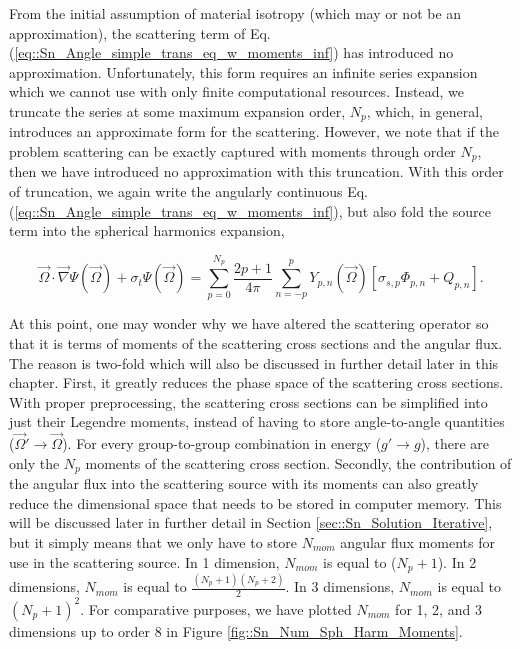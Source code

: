 From the initial assumption of material isotropy (which may or not be an approximation), the scattering term of Eq. (\ref{eq::Sn_Angle_simple_trans_eq_w_moments_inf}) has introduced no approximation. Unfortunately, this form requires an infinite series expansion which we cannot use with only finite computational resources. Instead, we truncate the series at some maximum expansion order, $N_p$, which, in general, introduces an approximate form for the scattering. However, we note that if the problem scattering can be exactly captured with moments through order $N_p$, then we have introduced no approximation with this truncation. With this order of truncation, we again write the angularly continuous Eq. (\ref{eq::Sn_Angle_simple_trans_eq_w_moments_inf}), but also fold the source term into the spherical harmonics expansion,

\begin{equation}
\label{eq::Sn_Angle_simple_trans_eq_w_moments_trunc}
\vec{\Omega} \cdot \vec{\nabla} \Psi (\vec{\Omega}) + \sigma_t \Psi (\vec{\Omega}) = \sum_{p=0}^{N_p} \frac{2p + 1}{4 \pi}   \sum_{n=-p}^{p}   Y_{p,n} (  \vec{\Omega} ) \left[ \sigma_{s,p} \Phi_{p,n} + Q_{p,n}  \right] .
\end{equation}

At this point, one may wonder why we have altered the scattering operator so that it is terms of moments of the scattering cross sections and the angular flux. The reason is two-fold which will also be discussed in further detail later in this chapter. First, it greatly reduces the phase space of the scattering cross sections. With proper preprocessing, the scattering cross sections can be simplified into just their Legendre moments, instead of having to store angle-to-angle quantities ($\vec{\Omega}' \rightarrow \vec{\Omega}$). For every group-to-group combination in energy ($g' \rightarrow g$), there are only the $N_p$ moments of the scattering cross section. Secondly, the contribution of the angular flux into the scattering source with its moments can also greatly reduce the dimensional space that needs to be stored in computer memory. This will be discussed later in further detail in Section \ref{sec::Sn_Solution_Iterative}, but it simply means that we only have to store $N_{mom}$ angular flux moments for use in the scattering source. In 1 dimension, $N_{mom}$ is equal to ($N_p + 1$). In 2 dimensions, $N_{mom}$ is equal to $\frac{(N_p + 1) (N_p + 2)}{2}$. In 3 dimensions, $N_{mom}$ is equal to $(N_p + 1)^2$. For comparative purposes, we have plotted $N_{mom}$ for 1, 2, and 3 dimensions up to order 8 in Figure \ref{fig::Sn_Num_Sph_Harm_Moments}.

